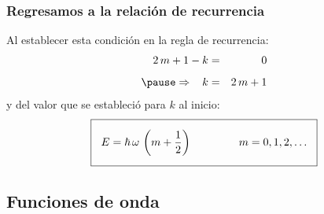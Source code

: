 \documentclass[12pt]{beamer}
\begin{document}
\begin{frame}
\frametitle{Regresamos a la relación de recurrencia}
Al establecer esta condición en la regla de recurrencia:
\pause
\begin{eqnarray*}
2 \, m + 1 - k &=& 0 \\[0.5em] \pause
\Rightarrow \hspace{0.3cm} k &=& 2 \, m + 1
\end{eqnarray*}
\pause
y del valor que se estableció para $k$ al inicio:
\pause
\begin{align*}
\setlength{\fboxsep}{3\fboxsep}\boxed{
E = \hbar \, \omega \, \left( m + \dfrac{1}{2} \right) \hspace{1.5cm} m = 0, 1, 2, \ldots }
\end{align*}
\end{frame}

\subsection{Funciones de onda}
\end{document}
